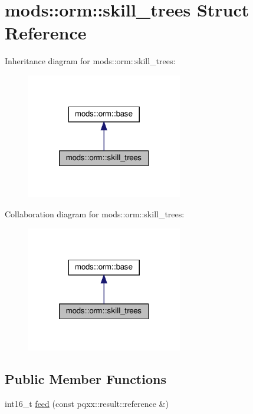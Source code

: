 \hypertarget{structmods_1_1orm_1_1skill__trees}{}\section{mods\+:\+:orm\+:\+:skill\+\_\+trees Struct Reference}
\label{structmods_1_1orm_1_1skill__trees}


Inheritance diagram for mods\+:\+:orm\+:\+:skill\+\_\+trees\+:
\nopagebreak
\begin{figure}[H]
\begin{center}
\leavevmode
\includegraphics[width=193pt]{structmods_1_1orm_1_1skill__trees__inherit__graph}
\end{center}
\end{figure}


Collaboration diagram for mods\+:\+:orm\+:\+:skill\+\_\+trees\+:
\nopagebreak
\begin{figure}[H]
\begin{center}
\leavevmode
\includegraphics[width=193pt]{structmods_1_1orm_1_1skill__trees__coll__graph}
\end{center}
\end{figure}
\subsection*{Public Member Functions}
\begin{DoxyCompactItemize}
\item 
int16\+\_\+t \hyperlink{structmods_1_1orm_1_1skill__trees_af014042f1e7b8c873dcb08135e744b8a}{feed} (const pqxx\+::result\+::reference \&)
\end{DoxyCompactItemize}
